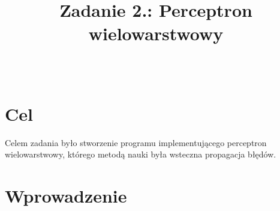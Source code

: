 \documentclass{classrep}
\author{%
    \studentinfo[216806@edu.p.lodz.pl]{Kamil Kowalewski}{216806}\\
    \studentinfo[216920@edu.p.lodz.pl]{Tomasz Witczak}{216920}%
}
\title{Zadanie 2.: Perceptron wielowarstwowy}
\begin{document}
    \maketitle
    \thispagestyle{fancyplain}

    \section{Cel}
    {
        Celem zadania było stworzenie programu implementującego perceptron wielowarstwowy,
        którego metodą nauki była wsteczna propagacja błędów.
    }
    \section{Wprowadzenie}
\end{document}
